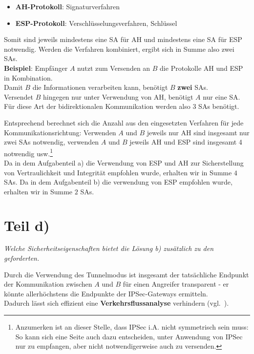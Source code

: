 \begin{itemize}
    \item \textbf{AH-Protokoll}: Signaturverfahren
    \item \textbf{ESP-Protokoll}: Verschlüsselungsverfahren, Schlüssel
\end{itemize}

\noindent
Somit sind jeweils mindestens eine SA für AH und mindestens eine SA für ESP notwendig.
Werden die Verfahren kombiniert, ergibt sich in Summe also zwei SAs.\\

\noindent
\textbf{Beispiel}:
Empfänger $A$ nutzt zum Versenden an $B$ die Protokolle AH und ESP in Kombination.\\
Damit $B$ die Informationen verarbeiten kann, benötigt $B$ \textbf{zwei} SAs.\\
Versendet $B$ hingegen nur unter Verwendung von AH, benötigt $A$ nur eine SA.
Für diese Art der bidirektionalen Kommunikation werden also 3 SAs benötigt.

\noindent
Entsprechend berechnet sich die Anzahl aus den eingesetzten Verfahren für jede Kommunikationsrichtung: Verwenden $A$ und $B$ jeweils nur AH sind insgesamt nur zwei SAs notwendig, verwenden $A$ und $B$ jeweils AH und ESP sind insgesamt 4 notwendig usw.\footnote{
    Anzumerken ist an dieser Stelle, dass IPSec i.A. nicht symmetrisch sein muss: So kann sich eine Seite auch dazu entscheiden, unter Anwendung von IPSec nur zu empfangen, aber nicht notwendigerweise auch zu versenden.
}\\

\noindent
Da in dem Aufgabenteil a) die  Verwendung von ESP und AH zur Sicherstellung von Vertraulichkeit und Integrität empfohlen wurde, erhalten wir in Summe $4$ SAs.
Da in dem Aufgabenteil b) die verwendung von ESP empfohlen wurde, erhalten wir in Summe $2$ SAs.\\


\section{Teil d)}

\textit{Welche Sicherheitseigenschaften bietet die Lösung b) zusätzlich zu den geforderten.}

\noindent
Durch die Verwendung des Tunnelmodus ist insgesamt der tatsächliche Endpunkt der Kommunikation zwischen $A$ und $B$ für einen Angreifer transparent - er könnte allerhöchstens die Endpunkte der IPSec-Gateways ermitteln.\\
Dadurch lässt sich effizient eine \textbf{Verkehrsflussanalyse} verhindern (vgl.~\cite[46]{ITS4}).